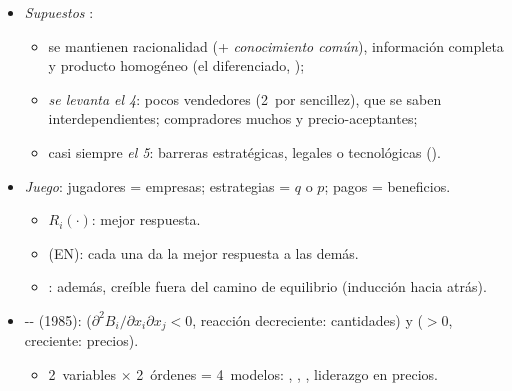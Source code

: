 \documentclass{article}
\begin{document}
\begin{columnas}
\begin{itemize}
\item \emph{Supuestos} :
  \begin{itemize}
  \item se mantienen racionalidad (+ \emph{conocimiento común}), información completa y producto homogéneo (el diferenciado, );
  \item \emph{se levanta el 4}: pocos vendedores (2~por sencillez), que se saben interdependientes; compradores muchos y precio-aceptantes;
  \item casi siempre \emph{el 5}: barreras  estratégicas, legales o tecnológicas ().
  \end{itemize}
\item \emph{Juego}: jugadores = empresas; estrategias = $q$ o $p$; pagos = beneficios.
  \begin{itemize}
  \item {} $R_i(\cdot)$: mejor respuesta.
  \item {} (EN): cada una da la mejor respuesta a las demás.
  \item {}: además, creíble fuera del camino de equilibrio (inducción hacia atrás).
  \end{itemize}
\item {}-- (1985):  ($\partial^2B_i/\partial x_i\partial x_j<0$, reacción decreciente: cantidades) y  ($>0$, creciente: precios).
  \begin{itemize}
  \item 2~variables $\times$ 2~órdenes = 4~modelos: , , , liderazgo en precios.
  \end{itemize}
\end{itemize}


\end{columnas}
\end{document}
